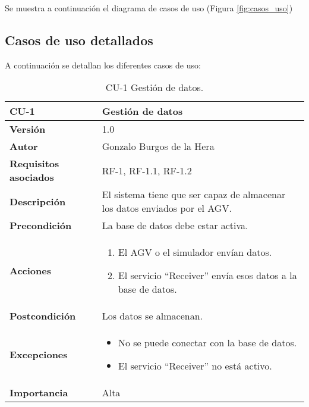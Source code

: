 Se muestra a continuación el diagrama de casos de uso (Figura \ref{fig:casos_uso})


\subsection{Casos de uso detallados}
A continuación se detallan los diferentes casos de uso:

\begin{table}[H]
	\centering
	\begin{tabularx}{\linewidth}{ p{} p{} }
		\toprule
		\textbf{CU-1}    & \textbf{Gestión de datos}\\
		\toprule
		\textbf{Versión}              & 1.0    \\
		\textbf{Autor}                & Gonzalo Burgos de la Hera \\
		\textbf{Requisitos asociados} & RF-1, RF-1.1, RF-1.2 \\
		\textbf{Descripción}          & El sistema tiene que ser capaz de almacenar los datos enviados por el AGV. \\
		\textbf{Precondición}         & La base de datos debe estar activa. \\
		\textbf{Acciones}             &
		\begin{enumerate}
			\def\labelenumi{\arabic{enumi}.}
			\tightlist
			\item El AGV o el simulador envían datos.
			\item El servicio ``Receiver'' envía esos datos a la base de datos.
		\end{enumerate}\\
		\textbf{Postcondición}        & Los datos se almacenan. \\
		\textbf{Excepciones}          & 
        \begin{itemize}
			\tightlist
			\item No se puede conectar con la base de datos.
			\item El servicio ``Receiver'' no está activo.
        \end{itemize} \\
		\textbf{Importancia}          & Alta \\
		\bottomrule
	\end{tabularx}
	\caption{CU-1 Gestión de datos.}
\end{table}


